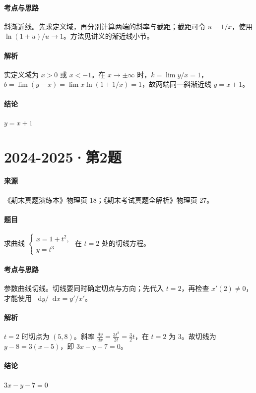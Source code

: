 \documentclass[UTF8,fontset=fandol,12pt,oneside,openany]{ctexrep}
\newcommand{\dd}{\mathop{}\!\mathrm d}
\theoremstyle{definition}
\begin{document}
\paragraph{考点与思路}
斜渐近线。先求定义域，再分别计算两端的斜率与截距；截距可令 $u=1/x$，使用 $\ln(1+u)/u\to1$。方法见讲义的渐近线小节。
\paragraph{解析}
实定义域为 $x>0$ 或 $x<-1$。在 $x\to\pm\infty$ 时，$k=\lim y/x=1$，$b=\lim(y-x)=\lim x\ln(1+1/x)=1$，故两端同一斜渐近线 $y=x+1$。
\paragraph{结论}
$y=x+1$

\par\addvspace{18pt}\noindent\begin{minipage}{\linewidth}
\section{2024-2025·第2题}
\paragraph{来源}《期末真题演练本》物理页 18；《期末考试真题全解析》物理页 27。
\paragraph{题目}
求曲线 $\begin{cases}x=1+t^2,\\y=t^3\end{cases}$ 在 $t=2$ 处的切线方程。
\end{minipage}\par
\paragraph{考点与思路}
参数曲线切线。切线要同时确定切点与方向；先代入 $t=2$，再检查 $x'(2)\ne0$，才能使用 $\dd y/\dd x=y'/x'$。
\paragraph{解析}
$t=2$ 时切点为 $(5,8)$。斜率 $\frac{dy}{dx}=\frac{3t^2}{2t}=\frac32t$，在 $t=2$ 为 $3$。故切线为 $y-8=3(x-5)$，即 $3x-y-7=0$。
\paragraph{结论}
$3x-y-7=0$
\end{document}
